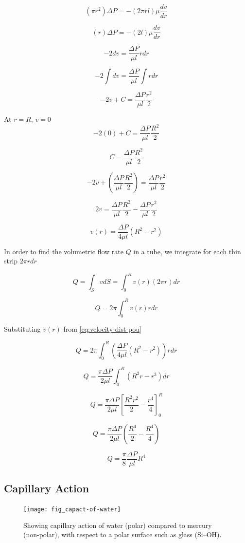 	\[ (\pi r^2) \Delta P = -(2 \pi r l) \mu \frac{dv}{dr} \]
	
	\[ (r) \Delta P = -(2 l) \mu \frac{dv}{dr} \]
	
	\[ -2dv = \frac{\Delta P}{\mu l} r dr \]
	
	\[ -2 \int dv = \frac{\Delta P}{\mu l} \int r dr \]
	
	\[ -2v + C = \frac{\Delta P}{\mu l} \frac{r^2}{2} \]
	
	At $r = R$, $v = 0$
	\[ -2(0) + C = \frac{\Delta P}{\mu l} \frac{R^2}{2} \]
	
	\[ C = \frac{\Delta P}{\mu l} \frac{R^2}{2} \]
	
	\[ -2v + \left( \frac{\Delta P}{\mu l} \frac{R^2}{2} \right) = \frac{\Delta P}{\mu l} \frac{r^2}{2} \]
	
	\[2v = \frac{\Delta P}{\mu l} \frac{R^2}{2} - \frac{\Delta P}{\mu l} \frac{r^2}{2} \]
	
	\begin{equation} \label{eq:velocity-dist-pou}
		v(r) = \frac{\Delta P}{4 \mu l} (R^2 - r^2)
	\end{equation}
	
	In order to find the volumetric flow rate $Q$ in a tube, we integrate for each thin strip $2 \pi r dr$
	
	\[ Q = \int_{S} vdS = \int_{0}^{R} v(r) (2 \pi r) dr \]
	
	\[ Q = 2 \pi \int_{0}^{R} v(r) r dr \]
	
	Substituting $v(r)$ from \ref{eq:velocity-dist-pou}
	
	\[ Q = 2 \pi \int_{0}^{R} \left( \frac{\Delta P}{4 \mu l} (R^2 - r^2)\right) r dr \]
	
	\[ Q =  \frac{\pi \Delta P}{2 \mu l} \int_{0}^{R} (R^2r - r^3)dr \]
	
	\[ Q =  \frac{\pi \Delta P}{2 \mu l} \left[ \frac{R^2r^2}{2} - \frac{r^4}{4} \right]_{0}^{R} \]
	
	\[ Q =  \frac{\pi \Delta P}{2 \mu l} \left( \frac{R^4}{2} - \frac{R^4}{4} \right) \]
	
	\begin{equation} \label{eq:flow-rate}
		\boxed{Q = \frac{\pi}{8} \frac{\Delta P}{\mu l} R^4}
	\end{equation}

\subsection{Capillary Action}

	\begin{figure}[H]
		\texttt{[image: fig\_capact-of-water]}
		\caption{Showing capillary action of water (polar) compared to mercury (non-polar), with respect to a polar surface such as glass (Si–OH).}
		\label{fig_capact-of-water}
	\end{figure}
	
